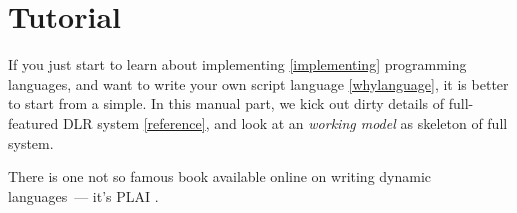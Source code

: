 \part{Tutorial}\label{newbie}

If you just start to learn about implementing \ref{implementing} programming
languages, and want to write your own script language \ref{whylanguage}, it is
better to start from a simple. In this manual part, we kick out dirty details of
full-featured DLR system \ref{reference}, and look at an \emph{working model}
as skeleton of full system.

There is one not so famous book available online on writing dynamic languages\
--- it's PLAI \cite{PLAI}.





